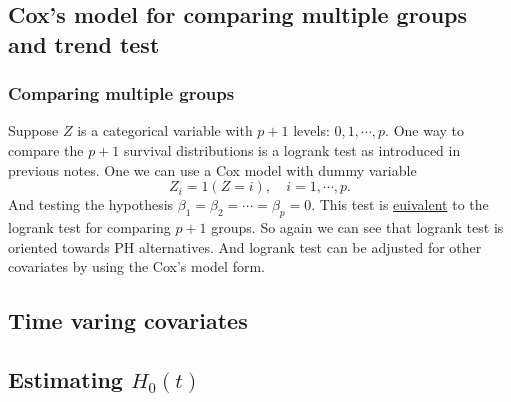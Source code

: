 \documentclass[a4paper,12pt]{article}
\begin{document}
\subsection{Cox's model for comparing multiple groups and trend test}
\label{sec:coxs-model-comparing}

\subsubsection{Comparing multiple groups}
\label{sec:comp-mult-groups}

Suppose $Z$ is a categorical variable with $p + 1$ levels: $0, 1, \cdots, p$. One way to compare the $p+1$ survival distributions is a logrank test as introduced in previous notes. One we can use a Cox model with dummy variable
\[
  Z_i = 1\left(Z = i\right), \quad i = 1, \cdots, p.
\]
And testing the hypothesis $\beta_1 = \beta_2 = \cdots = \beta_p = 0$. This test is \underline{euivalent} to the logrank test for comparing $p + 1$ groups. So again we can see that logrank test is oriented towards PH alternatives. And logrank test can be adjusted for other covariates by using the Cox's model form.
\par


\subsection{Time varing covariates}
\label{sec:time-varing-covar}


\subsection{Estimating $H_0\left(t\right)$}
\label{sec:estim-h_0l}









\end{document}
